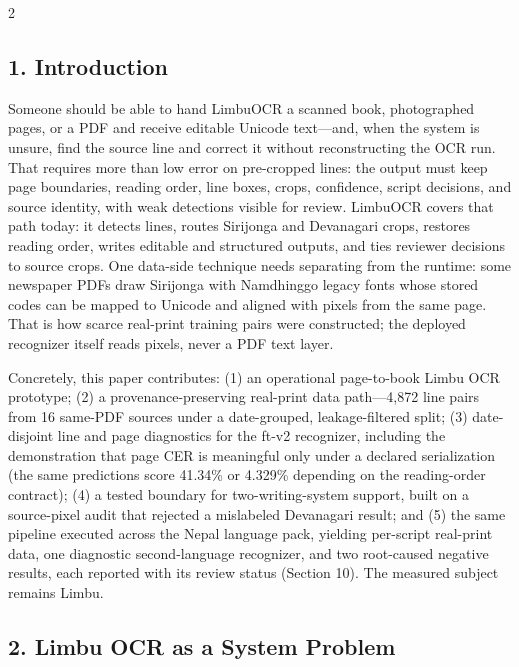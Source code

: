 \documentclass[
  10pt,
]{article}
\begin{document}
\begin{multicols}{2}
\subsection{1. Introduction}\label{introduction}

Someone should be able to hand LimbuOCR a scanned book, photographed
pages, or a PDF and receive editable Unicode text---and, when the system
is unsure, find the source line and correct it without reconstructing
the OCR run. That requires more than low error on pre-cropped lines: the
output must keep page boundaries, reading order, line boxes, crops,
confidence, script decisions, and source identity, with weak detections
visible for review. LimbuOCR covers that path today: it detects lines,
routes Sirijonga and Devanagari crops, restores reading order, writes
editable and structured outputs, and ties reviewer decisions to source
crops. One data-side technique needs separating from the runtime: some
newspaper PDFs draw Sirijonga with Namdhinggo legacy fonts whose stored
codes can be mapped to Unicode and aligned with pixels from the same
page. That is how scarce real-print training pairs were constructed; the
deployed recognizer itself reads pixels, never a PDF text layer.

Concretely, this paper contributes: (1) an operational page-to-book
Limbu OCR prototype; (2) a provenance-preserving real-print data
path---4,872 line pairs from 16 same-PDF sources under a date-grouped,
leakage-filtered split; (3) date-disjoint line and page diagnostics for
the ft-v2 recognizer, including the demonstration that page CER is
meaningful only under a declared serialization (the same predictions
score 41.34\% or 4.329\% depending on the reading-order contract); (4) a
tested boundary for two-writing-system support, built on a source-pixel
audit that rejected a mislabeled Devanagari result; and (5) the same
pipeline executed across the Nepal language pack, yielding per-script
real-print data, one diagnostic second-language recognizer, and two
root-caused negative results, each reported with its review status
(Section 10). The measured subject remains Limbu.

\subsection{2. Limbu OCR as a System
Problem}\label{limbu-ocr-as-a-system-problem}


\end{multicols}
\end{document}
